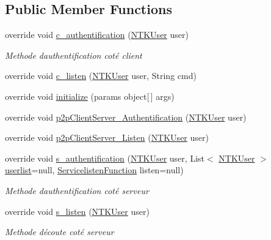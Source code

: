 \subsection*{Public Member Functions}
\begin{DoxyCompactItemize}
\item 
override void \mbox{\hyperlink{class_n_t_k_1_1_service_1_1_n_t_k_s___block_chain_ab29505226ecfe9bce4385aaa776a14d7}{c\+\_\+authentification}} (\mbox{\hyperlink{class_n_t_k_1_1_n_t_k_user}{N\+T\+K\+User}} user)
\begin{DoxyCompactList}\small\item\em Methode d\textquotesingle{}authentification coté client \end{DoxyCompactList}\item 
override void \mbox{\hyperlink{class_n_t_k_1_1_service_1_1_n_t_k_s___block_chain_ab8f7f1e5874fb416928cf2fd2743be83}{c\+\_\+listen}} (\mbox{\hyperlink{class_n_t_k_1_1_n_t_k_user}{N\+T\+K\+User}} user, String cmd)
\item 
override void \mbox{\hyperlink{class_n_t_k_1_1_service_1_1_n_t_k_s___block_chain_aa2ffcd0f46fc3a1dc9b5e4f9da7564c8}{initialize}} (params object\mbox{[}$\,$\mbox{]} args)
\item 
override void \mbox{\hyperlink{class_n_t_k_1_1_service_1_1_n_t_k_s___block_chain_a11c27887bafddcdae6f943ebe11a3462}{p2p\+Client\+Server\+\_\+\+Authentification}} (\mbox{\hyperlink{class_n_t_k_1_1_n_t_k_user}{N\+T\+K\+User}} user)
\item 
override void \mbox{\hyperlink{class_n_t_k_1_1_service_1_1_n_t_k_s___block_chain_aa3fedcf07d1cac1d60215c425930b1f0}{p2p\+Client\+Server\+\_\+\+Listen}} (\mbox{\hyperlink{class_n_t_k_1_1_n_t_k_user}{N\+T\+K\+User}} user)
\item 
override void \mbox{\hyperlink{class_n_t_k_1_1_service_1_1_n_t_k_s___block_chain_a2ed35ff54107d1b55f82abde57c20da6}{s\+\_\+authentification}} (\mbox{\hyperlink{class_n_t_k_1_1_n_t_k_user}{N\+T\+K\+User}} user, List$<$ \mbox{\hyperlink{class_n_t_k_1_1_n_t_k_user}{N\+T\+K\+User}} $>$ \mbox{\hyperlink{class_n_t_k_1_1_service_1_1_n_t_k_service_a14977c798a805fea99802fa40da31aa0}{userlist}}=null, \mbox{\hyperlink{namespace_n_t_k_1_1_service_a49f4581ae6fb3e9c155d034c47791db9}{Servicelisten\+Function}} listen=null)
\begin{DoxyCompactList}\small\item\em Methode d\textquotesingle{}authentification coté serveur \end{DoxyCompactList}\item 
override void \mbox{\hyperlink{class_n_t_k_1_1_service_1_1_n_t_k_s___block_chain_a5904f46c7cd3d4bd0b229c5cf9b4811d}{s\+\_\+listen}} (\mbox{\hyperlink{class_n_t_k_1_1_n_t_k_user}{N\+T\+K\+User}} user)
\begin{DoxyCompactList}\small\item\em Methode d\textquotesingle{}écoute coté serveur \end{DoxyCompactList}\end{DoxyCompactItemize}
